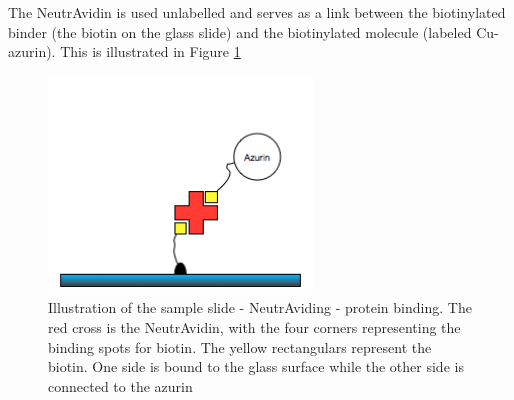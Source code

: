 \documentclass[twoside,single]{lion-msc}
\begin{document}
The NeutrAvidin is used unlabelled and serves as a link between the biotinylated binder (the biotin on the glass slide) and the biotinylated molecule (labeled Cu-azurin). This is illustrated in Figure \ref{avadinbinding} 

\begin{figure}[ht!]
\centering
\includegraphics[width=70mm]{avadin}
\caption{Illustration of the sample slide - NeutrAviding - protein binding. The red cross is the NeutrAvidin, with the four corners representing the binding spots for biotin. The yellow rectangulars represent the biotin. One side is bound to the glass surface while the other side is connected to the azurin}
\label{avadinbinding}
\end{figure}
\end{document}
